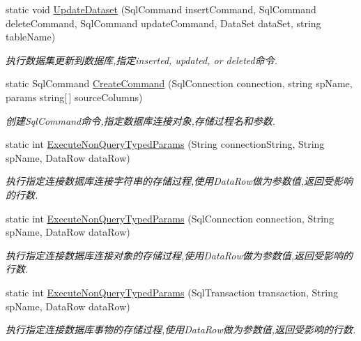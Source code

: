 \begin{DoxyCompactItemize}
static void \hyperlink{class_x_c_l_net_tools_1_1_data_base_1_1_m_s_s_q_l_1_1_sql_helper_ae2e82a516fbbd9314ac030bcaa179459}{Update\-Dataset} (Sql\-Command insert\-Command, Sql\-Command delete\-Command, Sql\-Command update\-Command, Data\-Set data\-Set, string table\-Name)
\begin{DoxyCompactList}\small\item\em 执行数据集更新到数据库,指定inserted, updated, or deleted命令. \end{DoxyCompactList}\item 
static Sql\-Command \hyperlink{class_x_c_l_net_tools_1_1_data_base_1_1_m_s_s_q_l_1_1_sql_helper_ac97a435a58c60f5231454eca755c5584}{Create\-Command} (Sql\-Connection connection, string sp\-Name, params string\mbox{[}$\,$\mbox{]} source\-Columns)
\begin{DoxyCompactList}\small\item\em 创建\-Sql\-Command命令,指定数据库连接对象,存储过程名和参数. \end{DoxyCompactList}\item 
static int \hyperlink{class_x_c_l_net_tools_1_1_data_base_1_1_m_s_s_q_l_1_1_sql_helper_a3261f4f8a7805d20c1d4feed8bd954b2}{Execute\-Non\-Query\-Typed\-Params} (String connection\-String, String sp\-Name, Data\-Row data\-Row)
\begin{DoxyCompactList}\small\item\em 执行指定连接数据库连接字符串的存储过程,使用\-Data\-Row做为参数值,返回受影响的行数. \end{DoxyCompactList}\item 
static int \hyperlink{class_x_c_l_net_tools_1_1_data_base_1_1_m_s_s_q_l_1_1_sql_helper_a9341debc6ce60c624231d4d292e5abe2}{Execute\-Non\-Query\-Typed\-Params} (Sql\-Connection connection, String sp\-Name, Data\-Row data\-Row)
\begin{DoxyCompactList}\small\item\em 执行指定连接数据库连接对象的存储过程,使用\-Data\-Row做为参数值,返回受影响的行数. \end{DoxyCompactList}\item 
static int \hyperlink{class_x_c_l_net_tools_1_1_data_base_1_1_m_s_s_q_l_1_1_sql_helper_a0b022ef626193170ec1e5a4935341cde}{Execute\-Non\-Query\-Typed\-Params} (Sql\-Transaction transaction, String sp\-Name, Data\-Row data\-Row)
\begin{DoxyCompactList}\small\item\em 执行指定连接数据库事物的存储过程,使用\-Data\-Row做为参数值,返回受影响的行数. \end{DoxyCompactList}\item 

\end{DoxyCompactItemize}

